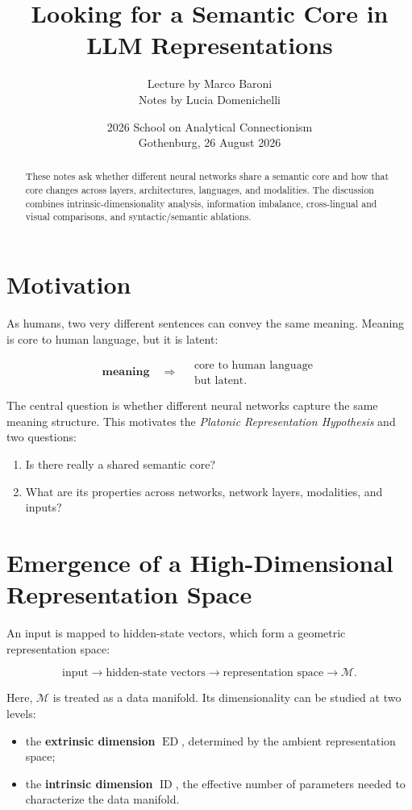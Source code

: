 \documentclass[11pt,a4paper]{article}
\title{Looking for a Semantic Core in LLM Representations}
\author{Lecture by Marco Baroni\\Notes by Lucia Domenichelli}
\date{2026 School on Analytical Connectionism\\Gothenburg, 26 August 2026}
\newcommand{\ID}{\operatorname{ID}}
\newcommand{\ED}{\operatorname{ED}}
\begin{document}
\maketitle

\begin{abstract}
These notes ask whether different neural networks share a semantic core and how
that core changes across layers, architectures, languages, and modalities. The
discussion combines intrinsic-dimensionality analysis, information imbalance,
cross-lingual and visual comparisons, and syntactic/semantic ablations.
\end{abstract}

\section{Motivation}

As humans, two very different sentences can convey the same meaning. Meaning is
core to human language, but it is latent:

\[
  \textbf{meaning}
  \quad\Longrightarrow\quad
  \substack{\text{core to human language}\\[2pt]\text{but latent}.}
\]

The central question is whether different neural networks capture the same
meaning structure. This motivates the \emph{Platonic Representation
Hypothesis} and two questions:

\begin{enumerate}
  \item Is there really a shared semantic core?
  \item What are its properties across networks, network layers, modalities,
        and inputs?
\end{enumerate}

\section{Emergence of a High-Dimensional Representation Space}

An input is mapped to hidden-state vectors, which form a geometric
representation space:

\[
  \text{input}
  \longrightarrow
  \boxed{\text{hidden-state vectors}}
  \longrightarrow
  \text{representation space}
  \longrightarrow
  \mathcal{M}.
\]

Here, $\mathcal{M}$ is treated as a data manifold. Its dimensionality can be
studied at two levels:

\begin{itemize}
  \item the \textbf{extrinsic dimension} $\ED$, determined by the ambient
        representation space;
  \item the \textbf{intrinsic dimension} $\ID$, the effective number of
        parameters needed to characterize the data manifold.
\end{itemize}
\end{document}
